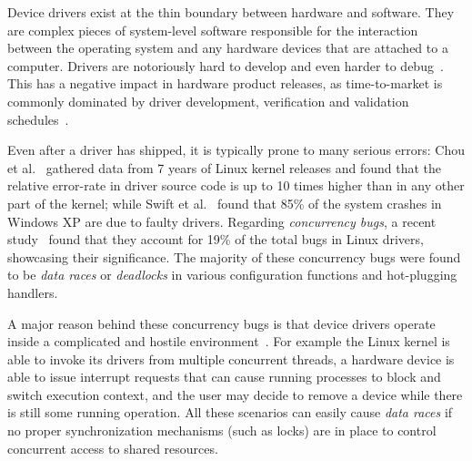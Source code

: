Device drivers exist at the thin boundary between hardware and software. They are complex pieces of system-level software responsible for the interaction between the operating system and any hardware devices that are attached to a computer. Drivers are notoriously hard to develop and even harder to debug~\cite{corbet2005linux}. This has a negative impact in hardware product releases, as time-to-market is commonly dominated by driver development, verification and validation schedules~\cite{yavatkar2012era}.

Even after a driver has shipped, it is typically prone to many serious errors: Chou et al.~\cite{chou2001empirical} gathered data from 7 years of Linux kernel releases and found that the relative error-rate in driver source code is up to 10 times higher than in any other part of the kernel; while Swift et al.~\cite{Swift2003windowsxp} found that 85\% of the system crashes in Windows XP are due to faulty drivers. Regarding \emph{concurrency bugs}, a recent study~\cite{ryzhyk2009dingo} found that they account for 19\% of the total bugs in Linux drivers, showcasing their significance. The majority of these concurrency bugs were found to be \emph{data races} or \emph{deadlocks} in various configuration functions and hot-plugging handlers.

A major reason behind these concurrency bugs is that device drivers operate inside a complicated and hostile environment~\cite{corbet2005linux}. For example the Linux kernel is able to invoke its drivers from multiple concurrent threads, a hardware device is able to issue interrupt requests that can cause running processes to block and switch execution context, and the user may decide to remove a device while there is still some running operation. All these scenarios can easily cause \emph{data races} if no proper synchronization mechanisms (such as locks) are in place to control concurrent access to shared resources.

